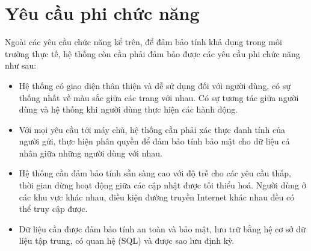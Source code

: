 \documentclass[../DoAn.tex]{subfiles}
\begin{document}
\newpage

\section{Yêu cầu phi chức năng}
\label{section:2.4}

Ngoài các yêu cầu chức năng kể trên, để đảm bảo tính khả dụng trong môi trường thực tế, hệ thống còn cần phải đảm bảo được các yêu cầu phi chức năng
như sau:

\begin{itemize}
    \item Hệ thống có giao diện thân thiện và dễ sử dụng đối với người dùng, có sự thống nhất về màu sắc giữa các trang với nhau.
          Có sự tương tác giữa người dùng và hệ thống khi người dùng thực hiện các hành động.
    \item Với mọi yêu cầu tới máy chủ, hệ thống cần phải xác thực danh tính của người gửi, thực hiện phân quyền để đảm bảo tính bảo mật cho
          dữ liệu cá nhân giữa những người dùng với nhau.
    \item Hệ thống cần đảm bảo tính sẵn sàng cao với độ trễ cho các yêu cầu thấp, thời gian dừng hoạt động giữa các cập nhật được tối thiểu hoá.
          Người dùng ở các khu vực khác nhau, điều kiện đường truyền Internet khác nhau đều có thể truy cập được.
    \item Dữ liệu cần được đảm bảo tính an toàn và bảo mật, lưu trữ bằng hệ cơ sở dữ liệu tập trung, có quan hệ (SQL) và được sao lưu định kỳ.
\end{itemize}

\end{document}

